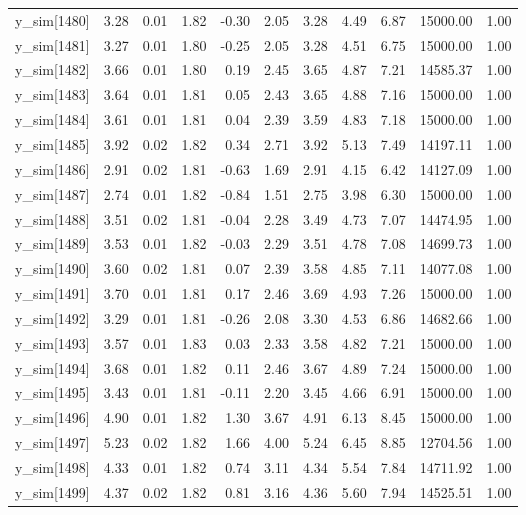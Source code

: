 \begin{table}[ht]
\begin{tabular}{rrrrrrrrrrr}
  y\_sim[1480] & 3.28 & 0.01 & 1.82 & -0.30 & 2.05 & 3.28 & 4.49 & 6.87 & 15000.00 & 1.00 \\ 
  y\_sim[1481] & 3.27 & 0.01 & 1.80 & -0.25 & 2.05 & 3.28 & 4.51 & 6.75 & 15000.00 & 1.00 \\ 
  y\_sim[1482] & 3.66 & 0.01 & 1.80 & 0.19 & 2.45 & 3.65 & 4.87 & 7.21 & 14585.37 & 1.00 \\ 
  y\_sim[1483] & 3.64 & 0.01 & 1.81 & 0.05 & 2.43 & 3.65 & 4.88 & 7.16 & 15000.00 & 1.00 \\ 
  y\_sim[1484] & 3.61 & 0.01 & 1.81 & 0.04 & 2.39 & 3.59 & 4.83 & 7.18 & 15000.00 & 1.00 \\ 
  y\_sim[1485] & 3.92 & 0.02 & 1.82 & 0.34 & 2.71 & 3.92 & 5.13 & 7.49 & 14197.11 & 1.00 \\ 
  y\_sim[1486] & 2.91 & 0.02 & 1.81 & -0.63 & 1.69 & 2.91 & 4.15 & 6.42 & 14127.09 & 1.00 \\ 
  y\_sim[1487] & 2.74 & 0.01 & 1.82 & -0.84 & 1.51 & 2.75 & 3.98 & 6.30 & 15000.00 & 1.00 \\ 
  y\_sim[1488] & 3.51 & 0.02 & 1.81 & -0.04 & 2.28 & 3.49 & 4.73 & 7.07 & 14474.95 & 1.00 \\ 
  y\_sim[1489] & 3.53 & 0.01 & 1.82 & -0.03 & 2.29 & 3.51 & 4.78 & 7.08 & 14699.73 & 1.00 \\ 
  y\_sim[1490] & 3.60 & 0.02 & 1.81 & 0.07 & 2.39 & 3.58 & 4.85 & 7.11 & 14077.08 & 1.00 \\ 
  y\_sim[1491] & 3.70 & 0.01 & 1.81 & 0.17 & 2.46 & 3.69 & 4.93 & 7.26 & 15000.00 & 1.00 \\ 
  y\_sim[1492] & 3.29 & 0.01 & 1.81 & -0.26 & 2.08 & 3.30 & 4.53 & 6.86 & 14682.66 & 1.00 \\ 
  y\_sim[1493] & 3.57 & 0.01 & 1.83 & 0.03 & 2.33 & 3.58 & 4.82 & 7.21 & 15000.00 & 1.00 \\ 
  y\_sim[1494] & 3.68 & 0.01 & 1.82 & 0.11 & 2.46 & 3.67 & 4.89 & 7.24 & 15000.00 & 1.00 \\ 
  y\_sim[1495] & 3.43 & 0.01 & 1.81 & -0.11 & 2.20 & 3.45 & 4.66 & 6.91 & 15000.00 & 1.00 \\ 
  y\_sim[1496] & 4.90 & 0.01 & 1.82 & 1.30 & 3.67 & 4.91 & 6.13 & 8.45 & 15000.00 & 1.00 \\ 
  y\_sim[1497] & 5.23 & 0.02 & 1.82 & 1.66 & 4.00 & 5.24 & 6.45 & 8.85 & 12704.56 & 1.00 \\ 
  y\_sim[1498] & 4.33 & 0.01 & 1.82 & 0.74 & 3.11 & 4.34 & 5.54 & 7.84 & 14711.92 & 1.00 \\ 
  y\_sim[1499] & 4.37 & 0.02 & 1.82 & 0.81 & 3.16 & 4.36 & 5.60 & 7.94 & 14525.51 & 1.00 \\ 

\end{tabular}
\end{table}
